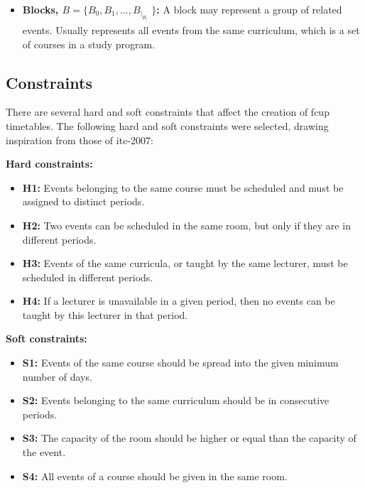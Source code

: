 \begin{itemize}
	\item \textbf{Blocks, \(B = \{B_0, B_1, ..., B_|_B_|_-_1\}\):} A block may represent a group of related events. Usually represents all events from the same curriculum, which is a set of courses in a study program.
\end{itemize}

\subsection{Constraints}

There are several hard and soft constraints that affect the creation of \ac{fcup} timetables. The following hard and soft constraints were selected, drawing inspiration from those of \ac{itc-2007}:

\textbf{Hard constraints:}

\begin{itemize}
	\item \textbf{H1:} Events belonging to the same course must be scheduled and must be assigned to distinct periods.
	\item \textbf{H2:} Two events can be scheduled in the same room, but only if they are in different periods.
	\item \textbf{H3:} Events of the same curricula, or taught by the same lecturer, must be scheduled in different periods.
	\item \textbf{H4:} If a lecturer is unavailable in a given period, then no events can be taught by this lecturer in that period.
\end{itemize}

\textbf{Soft constraints:}

\begin{itemize}
	\item \textbf{S1:} Events of the same course should be spread into the given minimum number of days.
	\item \textbf{S2:} Events belonging to the same curriculum should be in consecutive periods.
	\item \textbf{S3:} The capacity of the room should be higher or equal than the capacity of the event.
	\item \textbf{S4:} All events of a course should be given in the same room.
\end{itemize}

